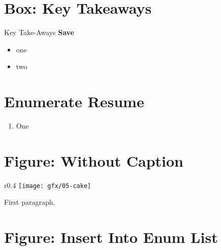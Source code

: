 \section{Box: Key Takeaways}
\begin{center}
	\begin{tkwbox}{Key Take-Aways}
		\textbf{Save}
		\\
		\begin{itemize}
			\setlength{\itemsep}{0pt}
			\setlength{\parskip}{0pt}
			\setlength{\parsep}{0pt}
			
			\item one
			\item two
			
		\end{itemize}
	\end{tkwbox}
\end{center}

\section{Enumerate Resume}
\begin{enumerate}[resume]
	\item One
\end{enumerate}

\section{Figure: Without Caption}

\begin{wrapfigure}{r}{0.4\textwidth}
	\centering
	\texttt{[image: gfx/05-cake]} 
\end{wrapfigure}

First paragraph.

\section{Figure: Insert Into Enum List}

